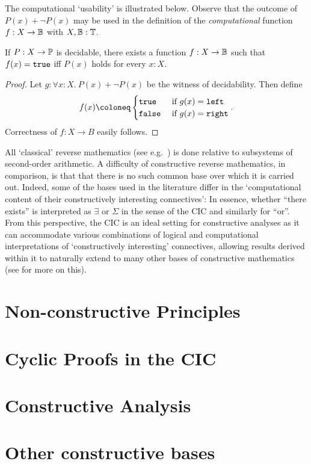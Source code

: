 The computational `usability' is illustrated below. Observe that the outcome of
$P(x) + \neg P(x)$ may be used in the definition of the \emph{computational}
function $f : X \to \mathbb{B}$ with $X, \mathbb{B} : \mathbb{T}$.
\begin{proposition}
  If $P : X \to \mathbb{P}$ is decidable, there exists a function $f : X \to \mathbb{B}$
  such that $f(x) = \texttt{true}$ iff $P(x)$ holds for every $x : X$.
\end{proposition}
\begin{proof}
  Let $g : \forall x : X.~P(x) + \neg P(x)$ be the witness of decidability. Then define
  \[
    f(x) \coloneq
    \begin{cases}
      \btrue & \text{ if } g(x) = \sleft \\
      \bfalse & \text{ if } g(x) = \sright
    \end{cases}.
  \]
  Correctness of $f : X \to B$ easily follows.
\end{proof}

All `classical' reverse mathematics (see e.g.~\needcite{}) is done relative to
subsystems of second-order arithmetic.
A difficulty of constructive reverse mathematics, in comparison, is that that
there is no such common base over which it is carried out. Indeed, some of the
bases used in the literature differ in the `computational content of their
constructively interesting connectives': In essence, whether ``there exists'' is
interpreted as $\exists$ or $\Sigma$ in the sense of the CIC and similarly for ``or''.
From this perspective, the CIC is an ideal setting for constructive analyses as
it can accommodate various combinations of logical and computational
interpretations of `constructively interesting' connectives, allowing results
derived within it to naturally extend to many other bases of constructive
mathematics (see  for more on this).

\section{Non-constructive Principles}
\label{sec:ncp}

\section{Cyclic Proofs in the CIC}
\label{sec:cic-cp}

\section{Constructive Analysis}
\label{sec:canalysis}

\section{Other constructive bases}
\label{sec:other-con}

